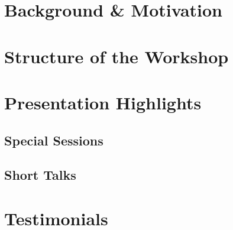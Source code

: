 \tableofcontents

\section{Background \& Motivation}



\section{Structure of the Workshop}



\section{Presentation Highlights}

\subsection{Special Sessions}





\subsection{Short Talks}
\label{sec:short-talks}



















\section{Testimonials}


